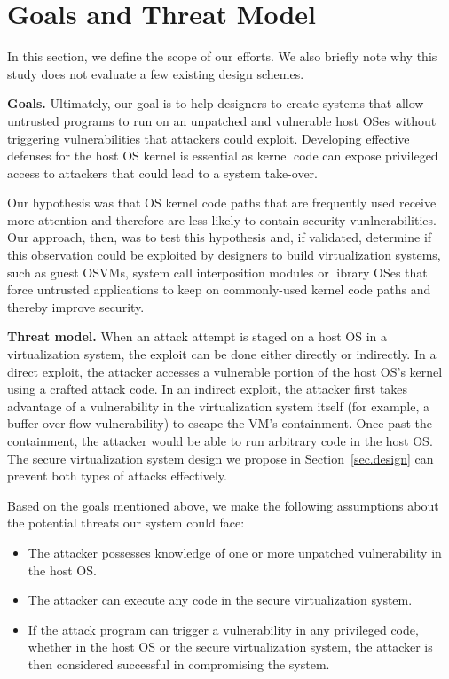 \section{Goals and Threat Model}
\label{sec.motivation-and-background}

In this section, we define the scope of our efforts. We also briefly note why
this study does not evaluate a few existing design schemes.

\noindent
\textbf{Goals.}
Ultimately, our goal is to help designers to
create systems that allow untrusted programs to 
run on an unpatched and vulnerable host OSes 
 without triggering vulnerabilities that attackers could exploit.
Developing effective defenses for the host OS kernel is essential as kernel code
can expose privileged access to attackers that could lead to a system take-over.

Our hypothesis was that OS kernel code paths that are frequently used receive
more
attention and therefore are less likely to contain security vunlnerabilities.
Our approach, then, was to test this hypothesis and, if validated, determine
if this observation could be exploited by designers to build 
virtualization systems, such as guest OSVMs, system call interposition modules
or library OSes that force untrusted applications to keep on commonly-used kernel
code paths and thereby improve security.



\noindent
\textbf{Threat model.}
When an attack attempt is staged
on a host OS in a virtualization system,
the exploit can be done either directly or indirectly.
In a direct exploit, the attacker accesses a vulnerable portion of the host OS's kernel
using a crafted attack code. In an indirect exploit,
the attacker first takes advantage of a vulnerability in the virtualization system itself
(for example, a buffer-over-flow vulnerability)
to escape the VM's containment. Once past the containment, the attacker would be able to run arbitrary code
in the host OS.
The secure virtualization system design we propose
in Section~\ref{sec.design} can prevent both types of attacks effectively.

Based on the goals mentioned above, we make the following assumptions about the
potential threats our system could face:

\begin{itemize}\setlength\itemsep{0em}

\item The attacker possesses knowledge of one or more unpatched
vulnerability in the host OS.

\item The attacker can execute any code in the secure
virtualization system.

\item If the attack program can trigger a vulnerability in any privileged
code, whether in the host OS or the secure virtualization system, the attacker
is then considered successful in compromising the system.

\end{itemize}

